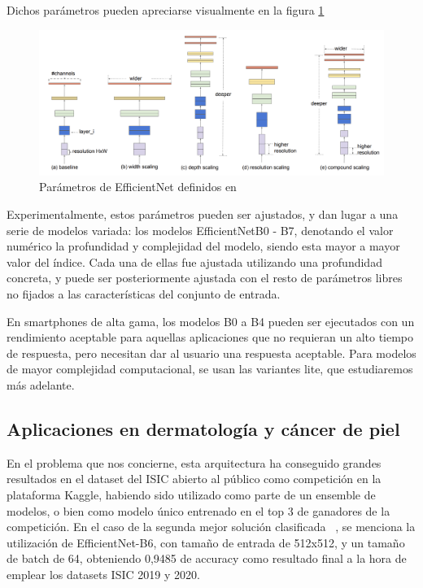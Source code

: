 Dichos parámetros pueden apreciarse visualmente en la figura \ref{fig:paramsefnet}

\begin{figure}[H]
	\centering
	\includegraphics[scale = 0.2]{imagenes/efnet_scale.png}
	\caption{Parámetros de EfficientNet definidos en~\cite{Chaturvedi_2020}}
	\label{fig:paramsefnet}
\end{figure}


Experimentalmente, estos parámetros pueden ser ajustados, y dan lugar a una serie de modelos variada: los modelos EfficientNetB0 - B7, denotando el valor numérico la profundidad y complejidad del modelo, siendo esta mayor a mayor valor del índice. Cada una de ellas fue ajustada utilizando una profundidad concreta, y puede ser posteriormente ajustada con el resto de parámetros libres no fijados a las características del conjunto de entrada.

En smartphones de alta gama, los modelos B0 a B4 pueden ser ejecutados con un rendimiento aceptable para aquellas aplicaciones que no requieran un alto tiempo de respuesta, pero necesitan dar al usuario una respuesta aceptable. Para modelos de mayor complejidad computacional, se usan las variantes lite, que estudiaremos más adelante.


\subsection{Aplicaciones en dermatología y cáncer de piel}

En el problema que nos concierne, esta arquitectura ha conseguido grandes resultados en el dataset del ISIC abierto al público como competición en la plataforma Kaggle, habiendo sido utilizado como parte de un ensemble de modelos, o bien como modelo único entrenado en el top 3 de ganadores de la competición. En el caso de la segunda mejor solución clasificada ~\cite{2ndISIC}, se menciona la utilización de EfficientNet-B6, con tamaño de entrada de 512x512, y un tamaño de batch de 64, obteniendo 0,9485 de accuracy como resultado final a la hora de emplear los datasets ISIC 2019 y 2020.

